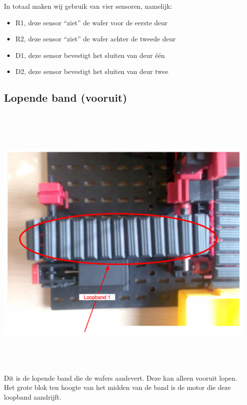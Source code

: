   In totaal maken wij gebruik van vier sensoren, namelijk:
  \begin{itemize}
    \item R1, deze sensor ``ziet'' de wafer voor de eerste deur
    \item R2, deze sensor ``ziet'' de wafer achter de tweede deur
    \item D1, deze sensor bevestigt het sluiten van deur \'{e}\'{e}n
    \item D2, deze sensor bevestigt het sluiten van deur twee
  \end{itemize}


\subsection{Lopende band (vooruit)}\label{sub:lopende_band_vooruit_} %
  \includegraphics[width=13cm, height=14cm]{LB1} \\
  
  Dit is de lopende band die de wafers aanlevert. Deze kan alleen vooruit lopen. \\
  Het grote blok ten hoogte van het midden van de band is de motor die deze loopband aandrijft.

